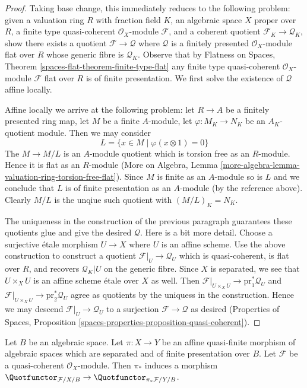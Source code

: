 \begin{proof}
Taking base change, this immediately reduces to the following
problem: given a valuation ring $R$ with fraction field $K$,
an algebraic space $X$ proper over $R$, a finite type quasi-coherent
$\mathcal{O}_X$-module $\mathcal{F}$, and a coherent
quotient $\mathcal{F}_K \to \mathcal{Q}_K$, show there exists
a quotient $\mathcal{F} \to \mathcal{Q}$ where $\mathcal{Q}$ is a
finitely presented $\mathcal{O}_X$-module
flat over $R$ whose generic fibre is $\mathcal{Q}_K$.
Observe that by Flatness on Spaces, Theorem
\ref{spaces-flat-theorem-finite-type-flat}
any finite type quasi-coherent $\mathcal{O}_X$-module
$\mathcal{F}$ flat over $R$ is of finite presentation.
We first solve the existence of $\mathcal{Q}$ affine locally.

\medskip\noindent
Affine locally we arrive at the following problem:
let $R \to A$ be a finitely presented ring map,
let $M$ be a finite $A$-module, let $\varphi : M_K \to N_K$ be
an $A_K$-quotient module. Then we may consider
$$
L = \{x \in M \mid \varphi(x \otimes 1) = 0 \}
$$
The $M \to M/L$ is an $A$-module quotient which is
torsion free as an $R$-module. Hence it is flat as an
$R$-module (More on Algebra, Lemma
\ref{more-algebra-lemma-valuation-ring-torsion-free-flat}).
Since $M$ is finite as an $A$-module so is $L$ and we
conclude that $L$ is of finite presentation as an $A$-module
(by the reference above). Clearly $M/L$ is the unqiue such
quotient with $(M/L)_K = N_K$.

\medskip\noindent
The uniqueness in the construction of the previous paragraph
guarantees these quotients glue and give the desired $\mathcal{Q}$.
Here is a bit more detail. Choose a surjective \'etale morphism
$U \to X$ where $U$ is an affine scheme. Use the above construction
to construct a quotient $\mathcal{F}|_U \to \mathcal{Q}_U$
which is quasi-coherent, is flat over $R$, and recovers $\mathcal{Q}_K|U$
on the generic fibre. Since $X$ is separated, we see that
$U \times_X U$ is an affine scheme \'etale over $X$ as well.
Then $\mathcal{F}|_{U \times_X U} \to \text{pr}_1^*\mathcal{Q}_U$ and
$\mathcal{F}|_{U \times_X U} \to \text{pr}_2^*\mathcal{Q}_U$
agree as quotients by the uniquess in the construction. Hence we may descend
$\mathcal{F}|_U \to \mathcal{Q}_U$ to a surjection
$\mathcal{F} \to \mathcal{Q}$ as desired (Properties of Spaces,
Proposition \ref{spaces-properties-proposition-quasi-coherent}).
\end{proof}

\begin{lemma}
\label{lemma-quot-functorial}
Let $B$ be an algebraic space. Let $\pi : X \to Y$ be an affine quasi-finite
morphism of algebraic spaces which are separated and of finite presentation
over $B$. Let $\mathcal{F}$ be a quasi-coherent $\mathcal{O}_X$-module.
Then $\pi_*$ induces a morphism
$\Quotfunctor_{\mathcal{F}/X/B} \to \Quotfunctor_{\pi_*\mathcal{F}/Y/B}$.
\end{lemma}


